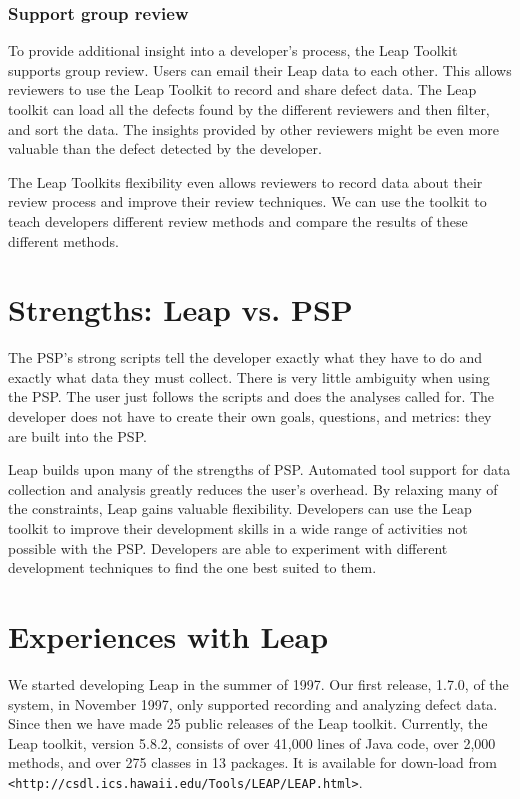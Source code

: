 \subsubsection{Support group review}

To provide additional insight into a developer's process, the Leap Toolkit
supports group review.  Users can email their Leap data to each other.  This
allows reviewers to use the Leap Toolkit to record and share defect data.  The
Leap toolkit can load all the defects found by the different reviewers and then 
filter, and sort the data.  The insights provided by other reviewers might be
even more valuable than the defect detected by the developer.

The Leap Toolkits flexibility even allows reviewers to record data about their
review process and improve their review techniques.  We can use the toolkit to
teach developers different review methods and compare the results of these
different methods. 


\section{Strengths: Leap vs. PSP}

The PSP's strong scripts tell the developer exactly what they have to do and
exactly what data they must collect.  There is very little ambiguity when using 
the PSP.  The user just follows the scripts and does the analyses called for.
The developer does not have to create their own goals, questions, and metrics:
they are built into the PSP.

Leap builds upon many of the strengths of PSP.  Automated tool support for data
collection and analysis greatly reduces the user's overhead.  By relaxing many
of the constraints, Leap gains valuable flexibility. Developers can use the
Leap toolkit to improve their development skills in a wide range of activities
not possible with the PSP.  Developers are able to experiment with different
development techniques to find the one best suited to them.

\section{Experiences with Leap}
We started developing Leap in the summer of 1997. Our first release, 1.7.0, of
the system, in November 1997, only supported recording and analyzing defect
data.  Since then we have made 25 public releases of the Leap toolkit.
Currently, the Leap toolkit, version 5.8.2, consists of over 41,000 lines of
Java code, over 2,000 methods, and over 275 classes in 13 packages.  It is
available for down-load from {\footnotesize {\tt
<http://csdl.ics.hawaii.edu/Tools/LEAP/LEAP.html>}}.  


